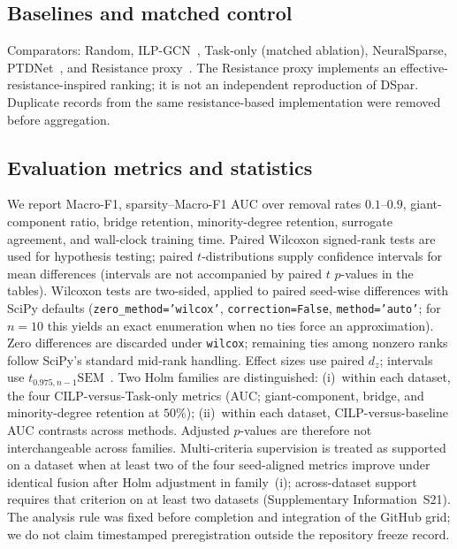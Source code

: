 \subsection{Baselines and matched control}
Comparators: Random, ILP-GCN~\citep{bangian2025ilp}, Task-only (matched ablation), NeuralSparse, PTDNet~\citep{zheng2020neuralsparse,luo2021ptdnet}, and Resistance proxy~\citep{spielman2011graph}.
The Resistance proxy implements an effective-resistance-inspired ranking; it is not an independent reproduction of DSpar.
Duplicate records from the same resistance-based implementation were removed before aggregation.

\subsection{Evaluation metrics and statistics}
We report Macro-F1, sparsity--Macro-F1 AUC over removal rates $0.1$--$0.9$, giant-component ratio, bridge retention, minority-degree retention, surrogate agreement, and wall-clock training time.
Paired Wilcoxon signed-rank tests are used for hypothesis testing; paired $t$-distributions supply confidence intervals for mean differences (intervals are not accompanied by paired $t$ $p$-values in the tables).
Wilcoxon tests are two-sided, applied to paired seed-wise differences with SciPy defaults (\texttt{zero\_method='wilcox'}, \texttt{correction=False}, \texttt{method='auto'}; for $n{=}10$ this yields an exact enumeration when no ties force an approximation).
Zero differences are discarded under \texttt{wilcox}; remaining ties among nonzero ranks follow SciPy's standard mid-rank handling.
Effect sizes use paired $d_z$; intervals use $t_{0.975,n-1}\mathrm{SEM}$~\citep{wilcoxon1945individual,holm1979simple,cohen1988statistical}.
Two Holm families are distinguished:
(i)~within each dataset, the four CILP-versus-Task-only metrics (AUC; giant-component, bridge, and minority-degree retention at $50\%$);
(ii)~within each dataset, CILP-versus-baseline AUC contrasts across methods.
Adjusted $p$-values are therefore not interchangeable across families.
Multi-criteria supervision is treated as supported on a dataset when at least two of the four seed-aligned metrics improve under identical fusion after Holm adjustment in family~(i); across-dataset support requires that criterion on at least two datasets (Supplementary Information~S21).
The analysis rule was fixed before completion and integration of the GitHub grid; we do not claim timestamped preregistration outside the repository freeze record.

